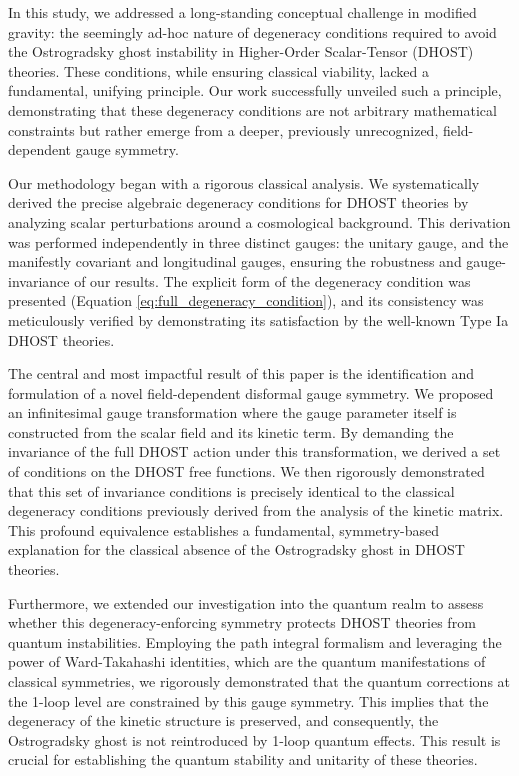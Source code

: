 \documentclass[twocolumn]{aastex631}
\begin{document}
In this study, we addressed a long-standing conceptual challenge in modified gravity: the seemingly ad-hoc nature of degeneracy conditions required to avoid the Ostrogradsky ghost instability in Higher-Order Scalar-Tensor (DHOST) theories. These conditions, while ensuring classical viability, lacked a fundamental, unifying principle. Our work successfully unveiled such a principle, demonstrating that these degeneracy conditions are not arbitrary mathematical constraints but rather emerge from a deeper, previously unrecognized, field-dependent gauge symmetry.

Our methodology began with a rigorous classical analysis. We systematically derived the precise algebraic degeneracy conditions for DHOST theories by analyzing scalar perturbations around a cosmological background. This derivation was performed independently in three distinct gauges: the unitary gauge, and the manifestly covariant and longitudinal gauges, ensuring the robustness and gauge-invariance of our results. The explicit form of the degeneracy condition was presented (Equation \ref{eq:full_degeneracy_condition}), and its consistency was meticulously verified by demonstrating its satisfaction by the well-known Type Ia DHOST theories.

The central and most impactful result of this paper is the identification and formulation of a novel field-dependent disformal gauge symmetry. We proposed an infinitesimal gauge transformation where the gauge parameter itself is constructed from the scalar field and its kinetic term. By demanding the invariance of the full DHOST action under this transformation, we derived a set of conditions on the DHOST free functions. We then rigorously demonstrated that this set of invariance conditions is precisely identical to the classical degeneracy conditions previously derived from the analysis of the kinetic matrix. This profound equivalence establishes a fundamental, symmetry-based explanation for the classical absence of the Ostrogradsky ghost in DHOST theories.

Furthermore, we extended our investigation into the quantum realm to assess whether this degeneracy-enforcing symmetry protects DHOST theories from quantum instabilities. Employing the path integral formalism and leveraging the power of Ward-Takahashi identities, which are the quantum manifestations of classical symmetries, we rigorously demonstrated that the quantum corrections at the 1-loop level are constrained by this gauge symmetry. This implies that the degeneracy of the kinetic structure is preserved, and consequently, the Ostrogradsky ghost is not reintroduced by 1-loop quantum effects. This result is crucial for establishing the quantum stability and unitarity of these theories.
\end{document}
